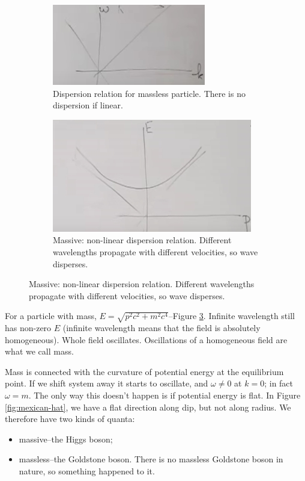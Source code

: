 \documentclass[]{article}
\begin{document}
\begin{figure}[H]
	\caption{Dispersion relations for Massive and Massless particles}
	\begin{subfigure}[t]{0.45\textwidth}
		\caption{Dispersion relation for massless particle. There is no dispersion if linear.}\label{fig:2-8-massless}
		\includegraphics[width=\textwidth]{2-8-massless}
	\end{subfigure}
	\begin{subfigure}[t]{0.45\textwidth}
		\caption{Massive: non-linear dispersion relation. Different wavelengths propagate with different velocities, so wave disperses.}\label{fig:2-8-massive}
		\includegraphics[width=\textwidth]{2-8-massive}
	\end{subfigure}
\end{figure}

For a particle with mass, $E=\sqrt{p^2 c^2 + m^2 c^4}$--Figure \ref{fig:2-8-massive}. Infinite wavelength still has non-zero $E$ (infinite wavelength means that the field is absolutely homogeneous). Whole field oscillates. Oscillations of a homogeneous field are what we call mass.

Mass is connected with the curvature of potential energy at the equilibrium point. If we shift system away it starts to oscillate, and $\omega \ne 0$ at $k=0$; in fact $\omega = m$. The only way this doesn't happen is if potential energy is flat. In Figure \ref{fig:mexican-hat}, we have a flat direction along dip, but not along radius. We therefore have two kinds of quanta:
\begin{itemize}
	\item massive--the Higgs boson;
	\item massless--the Goldstone boson. There is no massless Goldstone boson in nature, so something happened to it.
\end{itemize}
\end{document}
